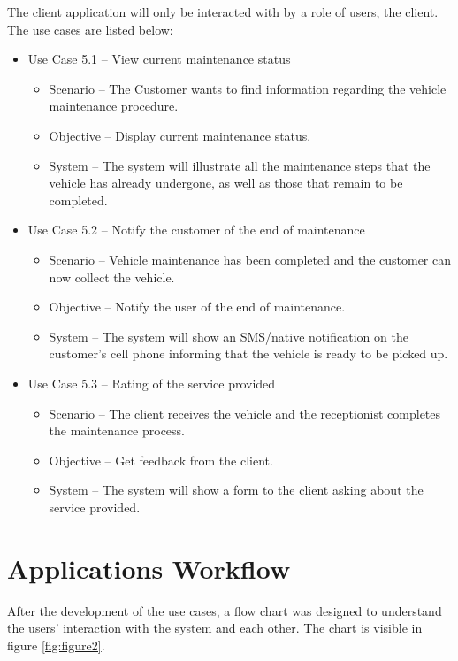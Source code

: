 The client application will only be interacted with by a role of users, the client.
The use cases are listed below:

\begin{itemize}
  \item Use Case 5.1 – View current maintenance status
  \begin{itemize}
    \item Scenario – The Customer wants to find information regarding the vehicle maintenance procedure.
    \item Objective – Display current maintenance status.
    \item System – The system will illustrate all the maintenance steps that the vehicle has already undergone, as well as those that remain to be completed. 
  \end{itemize}
  \item Use Case 5.2 – Notify the customer of the end of maintenance 
  \begin{itemize}
    \item Scenario – Vehicle maintenance has been completed and the customer can now collect the vehicle.
    \item Objective – Notify the user of the end of maintenance.
    \item System – The system will show an SMS/native notification on the customer's cell phone informing that the vehicle is ready to be picked up. 
  \end{itemize}
  \item Use Case 5.3 – Rating of the service provided
  \begin{itemize}
    \item Scenario – The client receives the vehicle and the receptionist completes the maintenance process.
    \item Objective – Get feedback from the client.
    \item System – The system will show a form to the client asking about the service provided. 
  \end{itemize}
\end{itemize}
\hfill \break

\section{Applications Workflow}

After the development of the use cases, a flow chart was designed to understand the users' interaction with the system and each other. The chart is visible in figure \ref{fig:figure2}.

